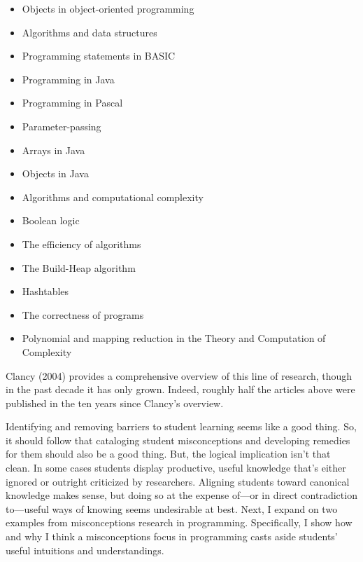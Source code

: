 \begin{itemize}
\tightlist
\item
  Objects in object-oriented programming \cite{holland_avoiding_1997}
\item
  Algorithms and data structures \cite{danielsiek_detecting_2012,paul_hunting_2013}
\item
  Programming statements in BASIC \cite{bayman_diagnosis_1983}
\item
  Programming in Java \cite{fleury_programming_2000}
\item
  Programming in Pascal \cite{fleury_student_1993}
\item
  Parameter-passing \cite{fleury_parameter_1991}
\item
  Arrays in Java \cite{kaczmarczyk_identifying_2010}
\item
  Objects in Java \cite{kaczmarczyk_identifying_2010}
\item
  Algorithms and computational complexity \cite{trakhtenbrot_students_2013}
\item
  Boolean logic \cite{herman_proof_2008}
\item
  The efficiency of algorithms \cite{gal-ezer_efficiency_2004}
\item
  The Build-Heap algorithm \cite{seppala_observations_2006}
\item
  Hashtables \cite{patitsas_countably_2013}
\item
  The correctness of programs \cite{kolikant_my_2008}
\item
  Polynomial and mapping reduction in the Theory and Computation of Complexity \cite{gal-ezer_identification_2016}
\end{itemize}

Clancy (2004) provides a comprehensive overview of this line of
research, though in the past decade it has only grown. Indeed, roughly
half the articles above were published in the ten years since Clancy's
overview.

Identifying and removing barriers to student learning seems like a good
thing. So, it should follow that cataloging student misconceptions and
developing remedies for them should also be a good thing. But, the
logical implication isn't that clean. In some cases students display
productive, useful knowledge that's either ignored or outright
criticized by researchers. Aligning students toward canonical knowledge
makes sense, but doing so at the expense of---or in direct contradiction
to---useful ways of knowing seems undesirable at best. Next, I expand on
two examples from misconceptions research in programming. Specifically,
I show how and why I think a misconceptions focus in programming casts
aside students' useful intuitions and understandings.

